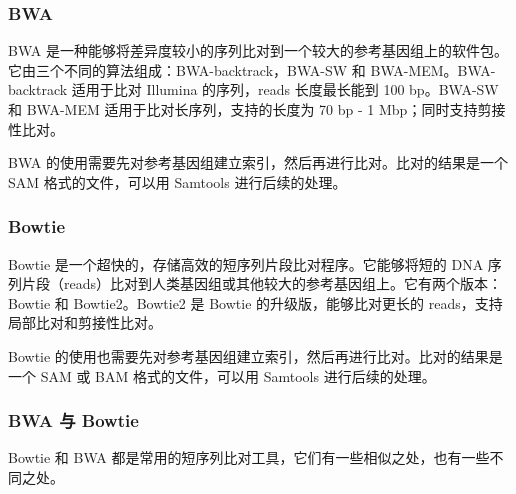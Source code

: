 \documentclass[UTF8]{ctexart}
\begin{document}
\subsubsection{BWA}

BWA 是一种能够将差异度较小的序列比对到一个较大的参考基因组上的软件包。它由三个不同的算法组成：BWA-backtrack，BWA-SW 和 BWA-MEM。BWA-backtrack 适用于比对 Illumina 的序列，reads 长度最长能到 100 bp。BWA-SW 和 BWA-MEM 适用于比对长序列，支持的长度为 70 bp - 1 Mbp；同时支持剪接性比对。

BWA 的使用需要先对参考基因组建立索引，然后再进行比对。比对的结果是一个 SAM 格式的文件，可以用 Samtools 进行后续的处理。

\subsubsection{Bowtie}

Bowtie 是一个超快的，存储高效的短序列片段比对程序。它能够将短的 DNA 序列片段（reads）比对到人类基因组或其他较大的参考基因组上。它有两个版本：Bowtie 和 Bowtie2。Bowtie2 是 Bowtie 的升级版，能够比对更长的 reads，支持局部比对和剪接性比对。

Bowtie 的使用也需要先对参考基因组建立索引，然后再进行比对。比对的结果是一个 SAM 或 BAM 格式的文件，可以用 Samtools 进行后续的处理。

\subsubsection{BWA 与 Bowtie}

Bowtie 和 BWA 都是常用的短序列比对工具，它们有一些相似之处，也有一些不同之处。
\end{document}
